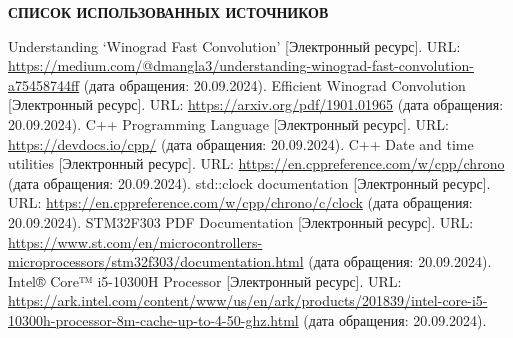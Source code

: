 \renewcommand{\bibname}{}
\begin{thebibliography}{6}
\renewcommand{\bibname}{СПИСОК ИСПОЛЬЗОВАННЫХ ИСТОЧНИКОВ}
\begin{center}
    \textbf{\bibname}
\end{center}
    Understanding ‘Winograd Fast Convolution’ [Электронный ресурс]. URL: \url{https://medium.com/@dmangla3/understanding-winograd-fast-convolution-a75458744ff} (дата обращения: 20.09.2024).
	Efficient Winograd Convolution [Электронный ресурс]. URL: \url{https://arxiv.org/pdf/1901.01965} (дата обращения: 20.09.2024).
	C++ Programming Language [Электронный ресурс]. URL: \url{https://devdocs.io/cpp/} (дата обращения: 20.09.2024).
	C++ Date and time utilities [Электронный ресурс]. URL: \url{https://en.cppreference.com/w/cpp/chrono} (дата обращения: 20.09.2024).
	std::clock documentation [Электронный ресурс]. URL: \url{https://en.cppreference.com/w/cpp/chrono/c/clock} (дата обращения: 20.09.2024).
	STM32F303 PDF Documentation [Электронный ресурс]. URL: \url{https://www.st.com/en/microcontrollers-microprocessors/stm32f303/documentation.html} (дата обращения: 20.09.2024).
	Intel® Core™ i5-10300H Processor [Электронный ресурс]. URL: \url{https://ark.intel.com/content/www/us/en/ark/products/201839/intel-core-i5-10300h-processor-8m-cache-up-to-4-50-ghz.html} (дата обращения: 20.09.2024).
\end{thebibliography}